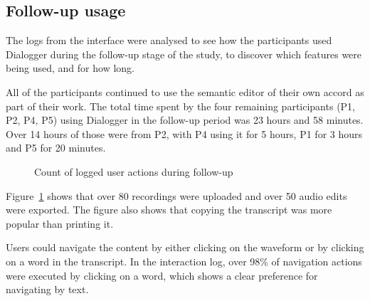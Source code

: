 \subsection{Follow-up usage}
The logs from the interface were analysed to see how the participants used Dialogger during the follow-up stage of the
study, to discover which features were being used, and for how long.

All of the participants continued to use the semantic editor of their own accord as part of their work. The total time
spent by the four remaining participants (P1, P2, P4, P5) using Dialogger in the follow-up period was 23 hours and 58
minutes.  Over 14 hours of those were from P2, with P4 using it for 5 hours, P1 for 3 hours and P5 for 20 minutes.

\begin{figure}
\centering
  \caption{Count of logged user actions during follow-up}
  \label{fig:actions}
\end{figure}

Figure~\ref{fig:actions} shows that over 80 recordings were uploaded and over 50 audio edits were exported. The figure
also shows that copying the transcript was more popular than printing it.

Users could navigate the content by either clicking on the waveform or by clicking on a word in the transcript. In the
interaction log, over 98\% of navigation actions were executed by clicking on a word, which shows a clear preference
for navigating by text.


